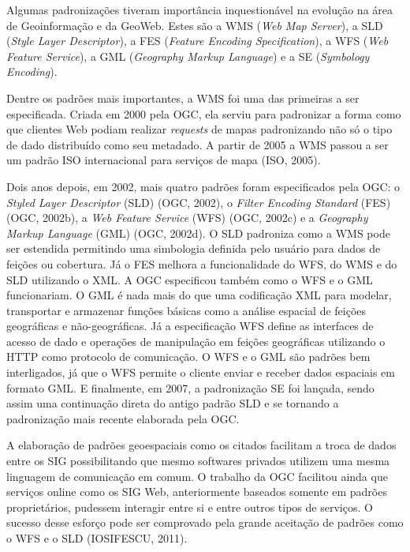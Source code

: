 		Algumas padronizações tiveram importância inquestionável na evolução na área de Geoinformação e da GeoWeb. Estes são a WMS (\textit{Web Map Server}), a SLD (\textit{Style Layer Descriptor}), a FES (\textit{Feature Encoding Specification}), a WFS (\textit{Web Feature Service}), a GML (\textit{Geography Markup Language}) e a SE (\textit{Symbology Encoding}).
		
		Dentre os padrões mais importantes, a WMS foi uma das primeiras a ser especificada. Criada em 2000 pela OGC, ela serviu para padronizar a forma como que clientes Web podiam realizar \textit{requests} de mapas padronizando não só o tipo de dado distribuído como seu metadado. A partir de 2005 a WMS passou a ser um padrão ISO internacional para serviços de mapa (ISO, 2005)\cite{ISO}.
		
		Dois anos depois, em 2002, mais quatro padrões foram especificados pela OGC: o \textit{Styled Layer Descriptor} (SLD) (OGC, 2002)\cite{OGC_02a}, o \textit{Filter Encoding Standard} (FES) (OGC, 2002b)\cite{OGC_02b}, a\textit{ Web Feature Service} (WFS) (OGC, 2002c)\cite{OGC_02c} e a \textit{Geography Markup Language} (GML) (OGC, 2002d)\cite{OGC_02d}. O SLD padroniza como a WMS pode ser estendida permitindo uma simbologia definida pelo usuário para dados de feições ou cobertura. Já o FES melhora a funcionalidade do WFS, do WMS e do SLD utilizando o XML. A OGC especificou também como o WFS e o GML funcionariam. O GML é nada mais do que uma codificação XML para modelar, transportar e armazenar funções básicas como a análise espacial de feições geográficas e não-geográficas. Já a especificação WFS define as interfaces de acesso de dado e operações de manipulação em feições geográficas utilizando o HTTP como protocolo de comunicação. O WFS e o GML são padrões bem interligados, já que o WFS permite o cliente enviar e receber dados espaciais em formato GML. E finalmente, em 2007, a padronização SE foi lançada, sendo assim uma continuação direta do antigo padrão SLD e se tornando a padronização mais recente elaborada pela OGC.
		
		A elaboração de padrões geoespaciais como os citados facilitam a troca de dados entre os SIG possibilitando que mesmo softwares privados utilizem uma mesma linguagem de comunicação em comum. O trabalho da OGC facilitou ainda que serviços online como os SIG Web, anteriormente baseados somente em padrões proprietários, pudessem interagir entre si e entre outros tipos de serviços. O sucesso desse esforço pode ser comprovado pela grande aceitação de padrões como o WFS e o SLD (IOSIFESCU, 2011)\cite{IOSIFESCU_11}.
		
